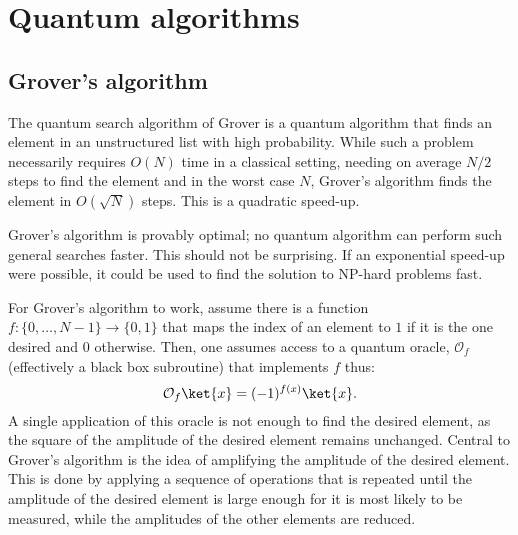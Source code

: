 \chapter{Quantum algorithms}

\section{Grover's algorithm}
The quantum search algorithm of Grover \cite{grover1996} is a quantum algorithm that finds an element in an unstructured list with high probability.
While such a problem necessarily requires $O(N)$ time in a classical setting, needing on average $N/2$ steps to find the element and in the worst case $N$, Grover's algorithm finds the element in $O(\sqrt{N})$ steps.
This is a quadratic speed-up.

Grover's algorithm is provably optimal; no quantum algorithm can perform such general searches faster.
This should not be surprising.
If an exponential speed-up were possible, it could be used to find the solution to NP-hard problems fast.

For Grover's algorithm to work, assume there is a function $f:\{0,\dots,N-1\}\to\{0,1\}$ that maps the index of an element to $1$ if it is the one desired and $0$ otherwise.
Then, one assumes access to a quantum oracle, $\mathcal{O}_f$
(effectively a black box subroutine) that implements $f$ thus:
\begin{equation}
    \label{eq:grover_oracle}
    \mathcal{O}_f \ket{x} = (-1)^{f(x)} \ket{x}.
\end{equation}
A single application of this oracle is not enough to find the desired element, as the square of the amplitude of the desired element remains unchanged.
Central to Grover's algorithm is the idea of amplifying the amplitude of the desired element.
This is done by applying a sequence of operations that is repeated until the amplitude of the desired element is large enough for it is most likely to be measured, while the amplitudes of the other elements are reduced.

